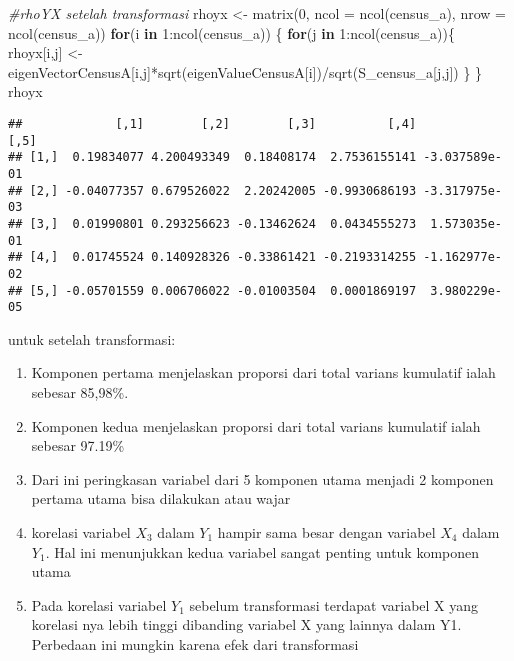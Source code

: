 \documentclass[
]{article}
\newenvironment{Shaded}{\begin{snugshade}}{\end{snugshade}}
\newcommand{\AttributeTok}[1]{\textcolor[rgb]{0.77,0.63,0.00}{#1}}
\newcommand{\CommentTok}[1]{\textcolor[rgb]{0.56,0.35,0.01}{\textit{#1}}}
\newcommand{\ControlFlowTok}[1]{\textcolor[rgb]{0.13,0.29,0.53}{\textbf{#1}}}
\newcommand{\DecValTok}[1]{\textcolor[rgb]{0.00,0.00,0.81}{#1}}
\newcommand{\FunctionTok}[1]{\textcolor[rgb]{0.00,0.00,0.00}{#1}}
\newcommand{\NormalTok}[1]{#1}
\newcommand{\OtherTok}[1]{\textcolor[rgb]{0.56,0.35,0.01}{#1}}
\newcommand{\SpecialCharTok}[1]{\textcolor[rgb]{0.00,0.00,0.00}{#1}}
\providecommand{\tightlist}{%
  \setlength{\itemsep}{0pt}\setlength{\parskip}{0pt}}
\begin{document}
\begin{Shaded}
\begin{Highlighting}[]
\CommentTok{\#rhoYX setelah transformasi}
\NormalTok{rhoyx }\OtherTok{\textless{}{-}} \FunctionTok{matrix}\NormalTok{(}\DecValTok{0}\NormalTok{, }\AttributeTok{ncol =} \FunctionTok{ncol}\NormalTok{(census\_a), }\AttributeTok{nrow =} \FunctionTok{ncol}\NormalTok{(census\_a))}
\ControlFlowTok{for}\NormalTok{(i }\ControlFlowTok{in} \DecValTok{1}\SpecialCharTok{:}\FunctionTok{ncol}\NormalTok{(census\_a))}
\NormalTok{\{}
  \ControlFlowTok{for}\NormalTok{(j }\ControlFlowTok{in} \DecValTok{1}\SpecialCharTok{:}\FunctionTok{ncol}\NormalTok{(census\_a))\{}
\NormalTok{   rhoyx[i,j] }\OtherTok{\textless{}{-}}\NormalTok{ eigenVectorCensusA[i,j]}\SpecialCharTok{*}\FunctionTok{sqrt}\NormalTok{(eigenValueCensusA[i])}\SpecialCharTok{/}\FunctionTok{sqrt}\NormalTok{(S\_census\_a[j,j])}
\NormalTok{  \}}
\NormalTok{\}}
\NormalTok{rhoyx}
\end{Highlighting}
\end{Shaded}

\begin{verbatim}
##             [,1]        [,2]        [,3]          [,4]          [,5]
## [1,]  0.19834077 4.200493349  0.18408174  2.7536155141 -3.037589e-01
## [2,] -0.04077357 0.679526022  2.20242005 -0.9930686193 -3.317975e-03
## [3,]  0.01990801 0.293256623 -0.13462624  0.0434555273  1.573035e-01
## [4,]  0.01745524 0.140928326 -0.33861421 -0.2193314255 -1.162977e-02
## [5,] -0.05701559 0.006706022 -0.01003504  0.0001869197  3.980229e-05
\end{verbatim}

untuk setelah transformasi:

\begin{enumerate}
\def\labelenumi{\arabic{enumi}.}
\tightlist
\item
  Komponen pertama menjelaskan proporsi dari total varians kumulatif
  ialah sebesar 85,98\%.
\item
  Komponen kedua menjelaskan proporsi dari total varians kumulatif ialah
  sebesar 97.19\%
\item
  Dari ini peringkasan variabel dari 5 komponen utama menjadi 2 komponen
  pertama utama bisa dilakukan atau wajar
\item
  korelasi variabel \(X_{3}\) dalam \(Y_{1}\) hampir sama besar dengan
  variabel \(X_{4}\) dalam \(Y_{1}\). Hal ini menunjukkan kedua variabel
  sangat penting untuk komponen utama
\item
  Pada korelasi variabel \(Y_{1}\) sebelum transformasi terdapat
  variabel X yang korelasi nya lebih tinggi dibanding variabel X yang
  lainnya dalam Y1. Perbedaan ini mungkin karena efek dari transformasi
\end{enumerate}
\end{document}
